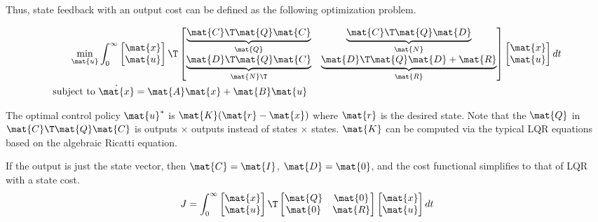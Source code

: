 Thus, state feedback with an output cost can be defined as the following
optimization problem.
\begin{theorem}
  \begin{align}
    \min_{\mat{u}} &\int_0^\infty
    \begin{bmatrix}
      \mat{x} \\
      \mat{u}
    \end{bmatrix}\T
    \begin{bmatrix}
      \underbrace{\mat{C}\T\mat{Q}\mat{C}}_{\mat{Q}} &
      \underbrace{\mat{C}\T\mat{Q}\mat{D}}_{\mat{N}} \\
      \underbrace{\mat{D}\T\mat{Q}\mat{C}}_{\mat{N}\T} &
      \underbrace{\mat{D}\T\mat{Q}\mat{D} + \mat{R}}_{\mat{R}}
    \end{bmatrix}
    \begin{bmatrix}
      \mat{x} \\
      \mat{u}
    \end{bmatrix}
    dt \nonumber \\
    \text{subject to } &\dot{\mat{x}} = \mat{A}\mat{x} + \mat{B}\mat{u}
  \end{align}

  The optimal control policy $\mat{u}^*$ is $\mat{K}(\mat{r} - \mat{x})$ where
  $\mat{r}$ is the desired state. Note that the $\mat{Q}$ in
  $\mat{C}\T\mat{Q}\mat{C}$ is outputs $\times$ outputs instead of states
  $\times$ states. $\mat{K}$ can be computed via the typical LQR equations based
  on the algebraic Ricatti equation.
\end{theorem}

If the output is just the state vector, then $\mat{C} = \mat{I}$,
$\mat{D} = \mat{0}$, and the cost functional simplifies to that of LQR with a
state cost.
\begin{equation*}
  J = \int_0^\infty
  \begin{bmatrix}
    \mat{x} \\
    \mat{u}
  \end{bmatrix}\T
  \begin{bmatrix}
    \mat{Q} & \mat{0} \\
    \mat{0} & \mat{R}
  \end{bmatrix}
  \begin{bmatrix}
    \mat{x} \\
    \mat{u}
  \end{bmatrix}
  dt
\end{equation*}
